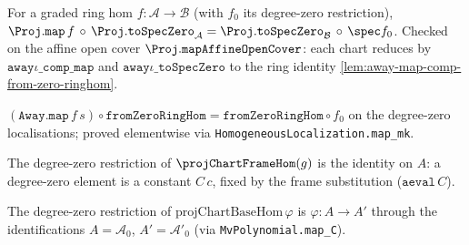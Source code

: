 \begin{lemma}

  \label{lem:proj-map-tospeczero}
  For a graded ring hom $f:\mathcal A\to\mathcal B$ (with $f_0$ its degree-zero
  restriction), $\Proj.\mathtt{map}\,f\,\circ\,\Proj.\mathtt{toSpecZero}_{\mathcal A}
  =\Proj.\mathtt{toSpecZero}_{\mathcal B}\,\circ\,\spec f_0$. Checked on the affine
  open cover $\Proj.\mathtt{mapAffineOpenCover}$: each chart reduces by
  $\mathtt{awayι\_comp\_map}$ and $\mathtt{awayι\_toSpecZero}$ to the ring identity
  \cref{lem:away-map-comp-from-zero-ringhom}.
\end{lemma}

\begin{lemma}

  \label{lem:away-map-comp-from-zero-ringhom}
  $(\mathtt{Away.map}\,f\,s)\circ\mathtt{fromZeroRingHom} =
  \mathtt{fromZeroRingHom}\circ f_0$ on the degree-zero localisations; proved
  elementwise via \texttt{HomogeneousLocalization.map\_mk}.
\end{lemma}

\begin{lemma}

  \label{lem:graded-zero-ringhom-projchart-frame-hom}
  The degree-zero restriction of $\projChartFrameHom(g)$ is the identity on $A$:
  a degree-zero element is a constant $C\,c$, fixed by the frame substitution
  ($\mathtt{aeval}\,C$).
\end{lemma}

\begin{lemma}

  \label{lem:graded-zero-ringhom-projchart-base-hom-comp}
  The degree-zero restriction of $\mathrm{projChartBaseHom}\,\varphi$ is
  $\varphi:A\to A'$ through the identifications $A=\mathcal A_0$, $A'=\mathcal A'_0$
  (via \texttt{MvPolynomial.map\_C}).
\end{lemma}

